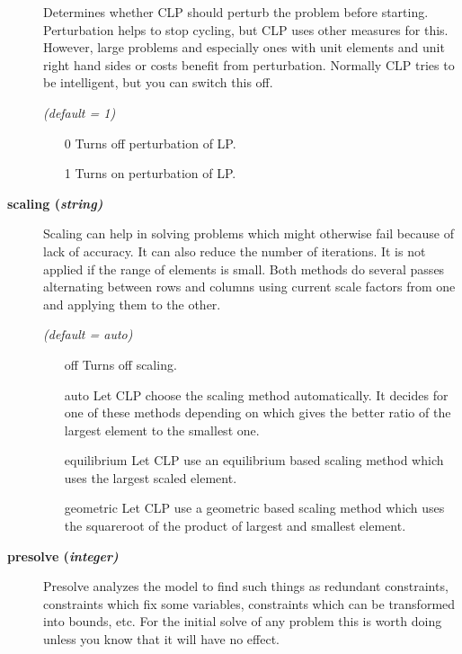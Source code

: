 \begin{description}
Determines whether CLP should perturb the problem before starting.
Perturbation helps to stop cycling, but CLP uses other measures for this.
However, large problems and especially ones with unit elements and unit right hand sides or costs benefit from perturbation.
Normally CLP tries to be intelligent, but you can switch this off.

\textsl{(default = 1)}
\begin{itemize}
\item[0] 
Turns off perturbation of LP.
\item[1] 
Turns on perturbation of LP.
\end{itemize}

\item[\label{scaling}\hypertarget{scaling}
{\textbf{scaling (\slshape{string})}}]\hspace{1.0in}

Scaling can help in solving problems which might otherwise fail because of lack of accuracy.
It can also reduce the number of iterations.
It is not applied if the range of elements is small.
Both methods do several passes alternating between rows and columns using current scale factors from one and applying them to the other.

\textsl{(default = auto)}
\begin{itemize}
\item[off] 
Turns off scaling.
\item[auto] 
Let CLP choose the scaling method automatically.
It decides for one of these methods depending on which gives the better ratio of the largest element to the smallest one.
\item[equilibrium] 
Let CLP use an equilibrium based scaling method which uses the largest scaled element.
\item[geometric] 
Let CLP use a geometric based scaling method which uses the squareroot of the product of largest and smallest element.
\end{itemize}

\item[\label{presolve}\hypertarget{presolve}
{\textbf{presolve (\slshape{integer})}}]\hspace{1.0in}

Presolve analyzes the model to find such things as redundant constraints, constraints which fix some variables, constraints which can be transformed into bounds, etc.
For the initial solve of any problem this is worth doing unless you know that it will have no effect.


\end{description}
